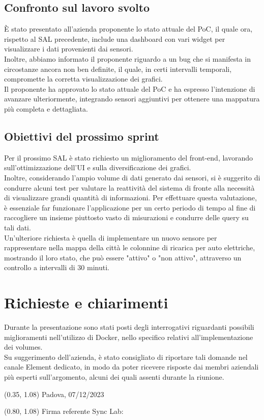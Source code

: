 \documentclass{article}
\begin{document}
    \subsection{Confronto sul lavoro svolto}
    È stato presentato all'azienda proponente lo stato attuale del PoC, il quale ora, rispetto al SAL precedente, include una dashboard con vari widget per visualizzare i dati provenienti dai sensori.\\
    Inoltre, abbiamo informato il proponente riguardo a un bug che si manifesta in circostanze ancora non ben definite, il quale, in certi intervalli temporali, compromette la corretta visualizzazione dei grafici.\\
    Il proponente ha approvato lo stato attuale del PoC e ha espresso l'intenzione di avanzare ulteriormente, integrando sensori aggiuntivi per ottenere una mappatura più completa e dettagliata.

    \subsection{Obiettivi del prossimo sprint}
    Per il prossimo SAL è stato richiesto un miglioramento del front-end, lavorando sull'ottimizzazione dell'UI e sulla diversificazione dei grafici.\\
    Inoltre, considerando l'ampio volume di dati generato dai sensori, si è suggerito di condurre alcuni test per valutare la reattività del sistema di fronte alla necessità di visualizzare grandi quantità di informazioni. Per effettuare questa valutazione, è essenziale far funzionare l'applicazione per un certo periodo di tempo al fine di raccogliere un insieme piuttosto vasto di misurazioni e condurre delle query su tali dati.\\
    Un'ulteriore richiesta è quella di implementare un nuovo sensore per rappresentare nella mappa della città le colonnine di ricarica per auto elettriche, mostrando il loro stato, che può essere "attivo" o "non attivo", attraverso un controllo a intervalli di 30 minuti. 

\section{Richieste e chiarimenti}
    Durante la presentazione sono stati posti degli interrogativi riguardanti possibili miglioramenti nell'utilizzo di Docker, nello specifico relativi all'implementazione dei volumes. \\
    Su suggerimento dell'azienda, è stato consigliato di riportare tali domande nel canale Element dedicato, in modo da poter ricevere risposte dai membri aziendali più esperti sull'argomento, alcuni dei quali assenti durante la riunione.  

\begin{textblock*}{\textwidth}(0.35\textwidth, 1.08\textheight)
    Padova, 07/12/2023
\end{textblock*}

\begin{textblock*}{\textwidth}(0.80\textwidth, 1.08\textheight)
        Firma referente Sync Lab:
\end{textblock*}
\end{document}
